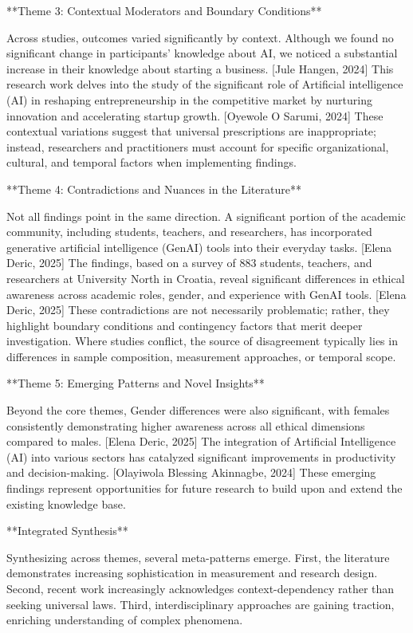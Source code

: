 \documentclass[11pt, a4paper]{article}
\begin{document}
**Theme 3: Contextual Moderators and Boundary Conditions**

Across studies, outcomes varied significantly by context. Although we found no significant change in participants’ knowledge about AI, we noticed a substantial increase in their knowledge about starting a business. [Jule Hangen, 2024] This research work delves into the study of the
significant role of Artificial intelligence (AI) in
reshaping entrepreneurship in the competitive
market by nurturing innovation and accelerating
startup growth. [Oyewole O Sarumi, 2024] These contextual variations suggest that universal prescriptions are inappropriate; instead, researchers and practitioners must account for specific organizational, cultural, and temporal factors when implementing findings.

**Theme 4: Contradictions and Nuances in the Literature**

Not all findings point in the same direction. A significant portion of the academic community, including students, teachers, and researchers, has incorporated generative artificial intelligence (GenAI) tools into their everyday tasks. [Elena Deric, 2025] The findings, based on a survey of 883 students, teachers, and researchers at University North in Croatia, reveal significant differences in ethical awareness across academic roles, gender, and experience with GenAI tools. [Elena Deric, 2025] These contradictions are not necessarily problematic; rather, they highlight boundary conditions and contingency factors that merit deeper investigation. Where studies conflict, the source of disagreement typically lies in differences in sample composition, measurement approaches, or temporal scope.

**Theme 5: Emerging Patterns and Novel Insights**

Beyond the core themes, Gender differences were also significant, with females consistently demonstrating higher awareness across all ethical dimensions compared to males. [Elena Deric, 2025] The integration of Artificial Intelligence (AI) into various sectors has catalyzed significant improvements in productivity and decision-making. [Olayiwola Blessing Akinnagbe, 2024] These emerging findings represent opportunities for future research to build upon and extend the existing knowledge base.

**Integrated Synthesis**

Synthesizing across themes, several meta-patterns emerge. First, the literature demonstrates increasing sophistication in measurement and research design. Second, recent work increasingly acknowledges context-dependency rather than seeking universal laws. Third, interdisciplinary approaches are gaining traction, enriching understanding of complex phenomena.
\end{document}
